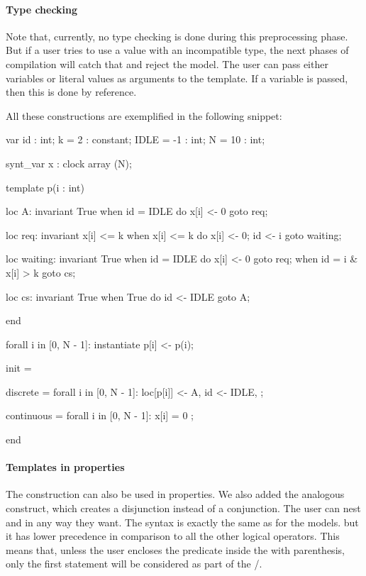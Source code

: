 \paragraph{Type checking}
Note that, currently, no type checking is done during this preprocessing phase.
But if a user tries to use a value with an incompatible type, the next phases of compilation will catch that and reject the model.
The user can pass either variables or literal values as arguments to the template.
If a variable is passed, then this is done by reference.



\begin{example}
All these constructions are exemplified in the following snippet:
\begin{IMITATORmodel}
var
    id        : int;
    k = 2     : constant;
    IDLE = -1 : int;
    N = 10    : int;

synt_var
    x : clock array (N);

template p(i : int)

loc A: invariant True
  when id = IDLE do { x[i] <- 0 } goto req;

loc req: invariant x[i] <= k
  when x[i] <= k do { x[i] <- 0; id <- i } goto waiting;

loc waiting: invariant True
  when id = IDLE do { x[i] <- 0 } goto req;
  when id = i & x[i] > k goto cs;

loc cs: invariant True
  when True do { id <- IDLE } goto A;

end

forall i in [0, N - 1]: instantiate p[i] <- p(i);

init = {

    discrete =
        forall i in [0, N - 1]: loc[p[i]] <- A,
        id <- IDLE,
    ;

    continuous =
        forall i in [0, N - 1]: x[i] = 0
    ;
}

end
\end{IMITATORmodel}
\end{example}

\paragraph{Templates in properties}

The  construction can also be used in properties. We also added the analogous  construct,
which creates a disjunction instead of a conjunction. The user can nest  and 
in any way they want.
The syntax is exactly the same as for the models. but it has
lower precedence in comparison to all the other logical operators.
This means that, unless the user encloses the predicate inside the  with parenthesis, only the first statement will be considered as part of the /.


